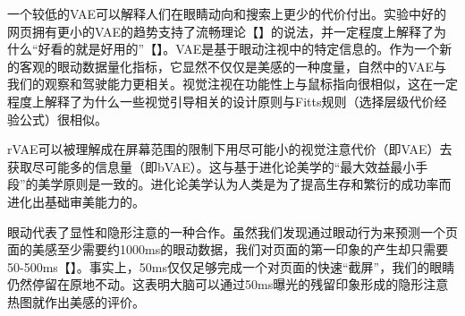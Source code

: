 一个较低的VAE可以解释人们在眼睛动向和搜索上更少的代价付出。实验中好的网页拥有更小的VAE的趋势支持了流畅理论【】的说法，并一定程度上解释了为什么“好看的就是好用的”【】。VAE是基于眼动注视中的特定信息的。作为一个新的客观的眼动数据量化指标，它显然不仅仅是美感的一种度量，自然中的VAE与我们的观察和驾驶能力更相关。视觉注视在功能性上与鼠标指向很相似，这在一定程度上解释了为什么一些视觉引导相关的设计原则与Fitts规则（选择层级代价经验公式）很相似。

rVAE可以被理解成在屏幕范围的限制下用尽可能小的视觉注意代价（即VAE）去获取尽可能多的信息量（即bVAE）。这与基于进化论美学的“最大效益最小手段”的美学原则是一致的。进化论美学认为人类是为了提高生存和繁衍的成功率而进化出基础审美能力的。

眼动代表了显性和隐形注意的一种合作。虽然我们发现通过眼动行为来预测一个页面的美感至少需要约1000ms的眼动数据，我们对页面的第一印象的产生却只需要50-500ms【】。事实上，50ms仅仅足够完成一个对页面的快速“截屏”，我们的眼睛仍然停留在原地不动。这表明大脑可以通过50ms曝光的残留印象形成的隐形注意热图就作出美感的评价。
